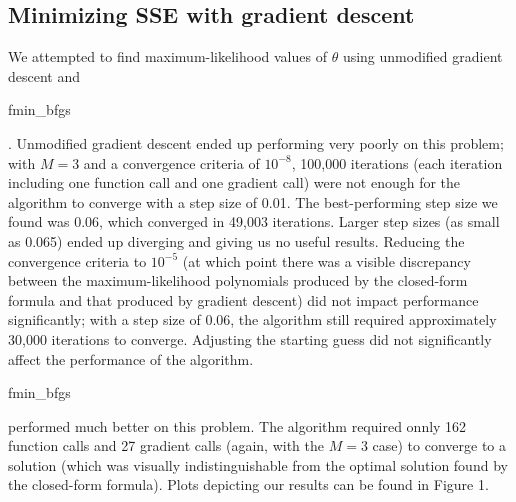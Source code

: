 \documentclass{article}
\begin{document}
\subsection{Minimizing SSE with gradient descent}
We attempted to find maximum-likelihood values of $\theta$ using unmodified gradient descent and \begin{tt}fmin\_bfgs\end{tt}. Unmodified gradient descent ended up performing very poorly on this problem; with $M=3$ and a convergence criteria of $10^{-8}$, 100,000 iterations (each iteration including one function call and one gradient call) were not enough for the algorithm to converge with a step size of 0.01. The best-performing step size we found was 0.06, which converged in 49,003 iterations. Larger step sizes (as small as 0.065) ended up diverging and giving us no useful results. Reducing the convergence criteria to $10^{-5}$ (at which point there was a visible discrepancy between the maximum-likelihood polynomials produced by the closed-form formula and that produced by gradient descent) did not impact performance significantly; with a step size of 0.06, the algorithm still required approximately 30,000 iterations to converge. Adjusting the starting guess did not significantly affect the performance of the algorithm.

\begin{tt}fmin\_bfgs\end{tt} performed much better on this problem. The algorithm required onnly 162 function calls and 27 gradient calls (again, with the $M=3$ case) to converge to a solution (which was visually indistinguishable from the optimal solution found by the closed-form formula). Plots depicting our results can be found in Figure 1.
\end{document}
